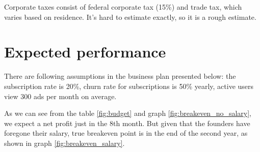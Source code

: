 Corporate taxes consist of federal corporate tax (15\%) and trade tax, which varies based on residence. It's hard to estimate exactly, so it is a rough estimate.

\section{Expected performance}

There are following assumptions in the business plan presented below: the subscription rate is 20\%, churn rate for subscriptions is 50\% yearly, active users view 300 ads per month on average.

\p
As we can see from the table \ref{fig:budget} and graph \ref{fig:breakeven_no_salary}, we expect a net profit just in the 8th month. But given that the founders have foregone their salary, true breakeven point is in the end of the second year, as shown in graph \ref{fig:breakeven_salary}.


